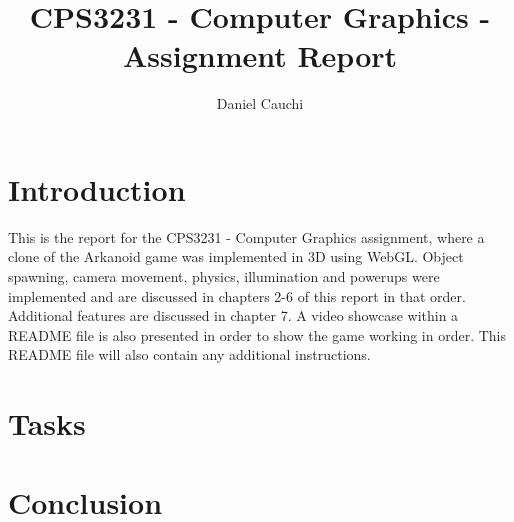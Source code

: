 \documentclass{report}
\begin{document}
\title{CPS3231  - Computer Graphics - Assignment Report}
\author{Daniel Cauchi}
\date{}
\maketitle

\tableofcontents

\chapter{Introduction}
This is the report for the CPS3231 - Computer Graphics assignment, where a clone of the Arkanoid game was implemented in 3D using WebGL. Object spawning, camera movement, physics, illumination and powerups were implemented and are discussed in chapters 2-6 of this report in that order. Additional features are discussed in chapter 7. A video showcase within a README file is also presented in order to show the game working in order. This README file will also contain any additional instructions.

\chapter{Tasks}

\pagebreak

\pagebreak

\pagebreak

\pagebreak

\pagebreak

\pagebreak

\chapter{Conclusion}



\pagebreak

\pagebreak

\end{document}
